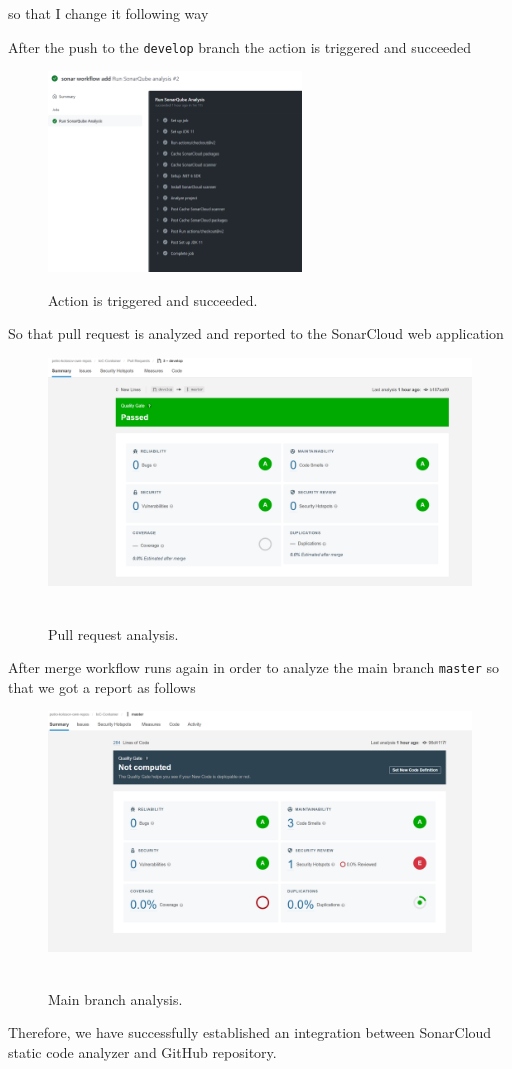 so that I change it following way

After the push to the \texttt{develop} branch the action is triggered and succeeded
\begin{figure}[H]
    \centering
    \includegraphics[width=0.6\textwidth]{img/10_action_screenshot}
    ~\caption{Action is triggered and succeeded.}\label{fig:figure10}
\end{figure}
So that pull request is analyzed and reported to the SonarCloud web application
\begin{figure}[H]
    \centering
    \includegraphics[width=1\textwidth]{img/11_pull_request_analyzed}
    ~\caption{Pull request analysis.}\label{fig:figure11}
\end{figure}
After merge workflow runs again in order to analyze the main branch \texttt{master} so that
we got a report as follows
\begin{figure}[H]
    \centering
    \includegraphics[width=1\textwidth]{img/12_main_branch_analyze}
    ~\caption{Main branch analysis.}\label{fig:figure12}
\end{figure}
Therefore, we have successfully established an integration between SonarCloud static code analyzer and GitHub repository.


